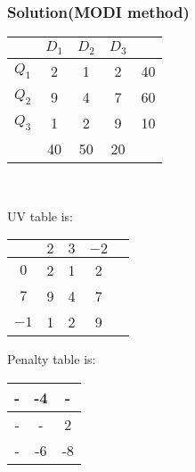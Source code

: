 \documentclass{beamer}
\begin{document}
\begin{frame}
\frametitle{Solution(MODI method)}
\begin{center}
\begin{tabular}{c|c c c|c}
 & $D_1$ & $D_2$ & $D_3$\\ \hline
$Q_1$ & 2 & 1 & 2 & 40\\
$Q_2$ & 9 & 4 & 7 & 60\\
$Q_3$ & 1 & 2 & 9 & 10\\ \hline
 & 40 & 50 & 20\\
\end{tabular}\\
\end{center}


UV table is:\\
\begin{center}

\begin{tabular}{c|c c c|c}
 & $2$ & $3$ & $-2$\\ \hline
$0$ & 2 & 1 & 2 \\
$7$ & 9 & 4 & 7 \\
$-1$ & 1 & 2 & 9\\ \hline

\end{tabular}

\end{center}
Penalty table is:\\
\begin{center}
\begin{tabular}{|c|c|c|}
\hline
- & -4 & - \\\hline
- & - & 2\\\hline
- & -6 & -8\\ \hline

\end{tabular}\\
\end{center}
\end{frame}

\end{document}
